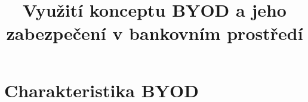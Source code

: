 \documentclass[thesis=M,czech]{FITthesis}[2012/06/26]
\title{Využití konceptu BYOD a jeho zabezpečení v bankovním prostředí}
\begin{document}













\begin{introduction}
	
\end{introduction}

\chapter{Charakteristika BYOD}\label{k1}

\end{document}
